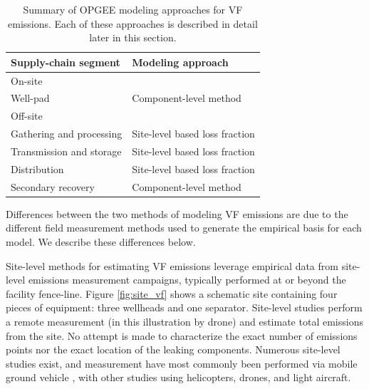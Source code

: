 \documentclass[11pt]{report}
\begin{document}
\begin{table}
\begin{scriptsize}
\caption{Summary of OPGEE modeling approaches for VF emissions. Each of these approaches is described in detail later in this section.}
\label{tab:VF_modeling_approaches}
\begin{threeparttable}
\begin{tabular*}{0.9\columnwidth}{p{}p{}}
\toprule
Supply-chain segment &	Modeling approach\\
\midrule
On-site	 & \\
\midrule
 Well-pad	& Component-level method \\
 \midrule 
Off-site	& \\
\midrule
 Gathering and processing &	Site-level based loss fraction \\
 Transmission and storage &	Site-level based loss fraction \\
Distribution &	Site-level based loss fraction \\
 Secondary recovery &	Component-level method\\
\bottomrule
\end{tabular*}
\end{threeparttable}
\end{scriptsize}
\end{table}

Differences between the two methods of modeling VF emissions are due to the different field measurement methods used to generate the empirical basis for each model. We describe these differences below.

Site-level methods for estimating VF emissions leverage empirical data from site-level emissions measurement campaigns, typically performed at or beyond the facility fence-line. Figure \ref{fig:site_vf} shows a schematic site containing four pieces of equipment: three wellheads and one separator. Site-level studies perform a remote measurement (in this illustration by drone) and estimate total emissions from the site. No attempt is made to characterize the exact number of emissions points nor the exact location of the leaking components. Numerous site-level studies exist, and measurement have most commonly been performed via mobile ground vehicle \cite{Yacovitch2015, Rella2015, Brantley2014}, with other studies using helicopters, drones, and light aircraft.
 
\end{document}
